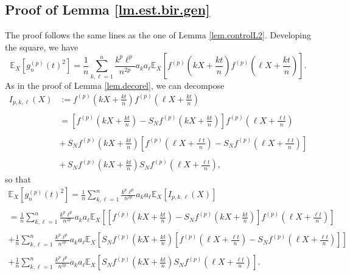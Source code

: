 \documentclass{svproc}
\begin{document}
\subsection{Proof of Lemma \ref{lm.est.bir.gen}}
The proof follows the same lines as the one of Lemma \ref{lem.controlL2}.
Developing the square, we have 
\[
\mathbb E_X [g_n^{(p)}(t)^2]=  \frac{1}{n} \sum_{k, \ell=1}^n \frac{k^{p}\ell^{p}}{n^{2p}}a_k a_{\ell} \mathbb E_X\left[ f^{(p)}\left(kX+\frac{kt}{n}\right)f^{(p)}\left(\ell X+\frac{kt}{n}\right)\right]. 
\]
As in the proof of Lemma \ref{lem.decorel}, we can decompose
\[
\begin{array}{ll}
I_{p,k,\ell}(X)& :=\displaystyle f^{(p)}\left(kX+\frac{kt}{n}\right)f^{(p)}\left(\ell X+\frac{kt}{n}\right) \\
\\
& = \displaystyle \left[f^{(p)}\left(kX+\frac{kt}{n}\right)-S_N f^{(p)}\left(kX+\frac{kt}{n}\right) \right]f^{(p)}\left(\ell X+\frac{\ell t}{n}\right) \\
\\
& \displaystyle +\,  S_N f^{(p)}\left(kX+\frac{kt}{n}\right) \left[ f^{(p)}\left(\ell X+\frac{\ell t}{n}\right)-S_N f^{(p)}\left(\ell X+\frac{\ell t}{n}\right)  \right]\\
\\
&\displaystyle + \, S_N f^{(p)}\left(kX+\frac{kt}{n}\right) S_N f^{(p)}\left(\ell X+\frac{\ell t}{n}\right),
\end{array}
\]
so that 
\[
\begin{array}{ll}
\displaystyle{\mathbb E_X [g_n^{(p)}(t)^2]}  = \frac{1}{n} \sum_{k, \ell=1}^n \frac{k^{p}\ell^{p}}{n^{2p}}a_k a_{\ell}  \mathbb E_X \left[ I_{p,k,\ell}(X)\right] \\
\\
   \displaystyle = \frac{1}{n} \sum_{k, \ell=1}^n \frac{k^{p}\ell^{p}}{n^{2p}}a_k a_{\ell} \mathbb E_X \left[ \left[f^{(p)}\left(kX+\frac{kt}{n}\right)-S_N f^{(p)}\left(kX+\frac{kt}{n}\right) \right]f^{(p)}\left(\ell X+\frac{\ell t}{n}\right) \right] \\
\\
 \displaystyle+\frac{1}{n} \sum_{k, \ell=1}^n \frac{k^{p}\ell^{p}}{n^{2p}}a_k a_{\ell} \mathbb E_X \left[ S_N f^{(p)}\left(kX+\frac{kt}{n}\right) \left[ f^{(p)}\left(\ell X+\frac{\ell t}{n}\right)-S_N f^{(p)}\left(\ell X+\frac{\ell t}{n}\right)  \right]\right]\\
 \\
 +\displaystyle \frac{1}{n} \sum_{k, \ell=1}^n \frac{k^p\ell^p}{n^{2p}}a_k a_{\ell} \mathbb E_X \left[ S_N f^{(p)}\left(kX+\frac{kt}{n}\right) S_N f^{(p)}\left(\ell X+\frac{\ell t}{n}\right)\right].
\end{array}
\]
\end{document}
